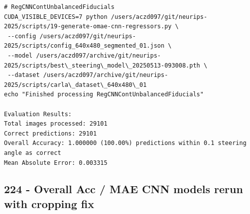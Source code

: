 \begin{verbatim}
# RegCNNContUnbalancedFiducials
CUDA_VISIBLE_DEVICES=7 python /users/aczd097/git/neurips-2025/scripts/19-generate-omae-cnn-regressors.py \
 --config /users/aczd097/git/neurips-2025/scripts/config_640x480_segmented_01.json \
 --model /users/aczd097/archive/git/neurips-2025/scripts/best\_steering\_model\_20250513-093008.pth \
 --dataset /users/aczd097/archive/git/neurips-2025/scripts/carla\_dataset\_640x480\_01
echo "Finished processing RegCNNContUnbalancedFiducials"

Evaluation Results:
Total images processed: 29101
Correct predictions: 29101
Overall Accuracy: 1.000000 (100.00%) predictions within 0.1 steering angle as correct
Mean Absolute Error: 0.003315

\end{verbatim}

\subsection{224 - Overall Acc / MAE CNN models rerun with cropping fix}
\label{app_res:224}

